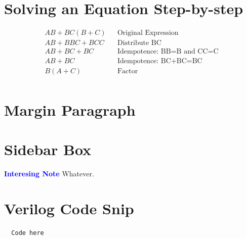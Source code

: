 \section{Solving an Equation Step-by-step}
\begin{align}
	\label{04:soln:solving_equation_one}
	AB+BC(B+C) && \text{Original Expression} \\
	\nonumber
	AB+BBC+BCC && \text{Distribute BC} \\
	\nonumber
	AB+BC+BC && \text{Idempotence: BB=B and CC=C} \\
	\nonumber
	AB+BC && \text{Idempotence: BC+BC=BC} \\
	\nonumber
	B(A+C) && \text{Factor} \\
\end{align}

\section{Margin Paragraph} 

\section{Sidebar Box}
\begin{tcolorbox}[colback=blue!5!white,colframe=blue!75!black]
	\textcolor{blue}{\textbf{Interesing Note}}
	\tcblower
	Whatever.
\end{tcolorbox}

\section{Verilog Code Snip}
\begin{lstlisting}
  Code here
\end{lstlisting}


